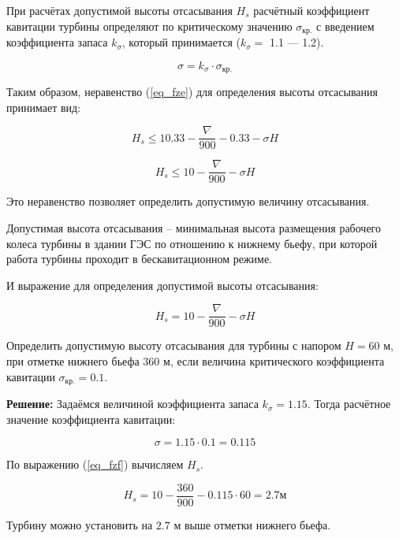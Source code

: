 При расчётах допустимой высоты отсасывания $H_s$ расчётный коэффициент кавитации  турбины определяют по критическому значению $\sigma_{\text{кр.}}$ с введением коэффициента запаса $k_{\sigma}$, который принимается ($k_{\sigma} = $ 1.1 --- 1.2).

$$
   \sigma = k_{\sigma} \cdot \sigma_{\text{кр.}}
$$

\vspace{0.5 cm}

Таким образом, неравенство (\ref{eq_fze}) для определения высоты отсасывания принимает вид:

$$
   H_s \leqslant 10.33 - \frac{\nabla}{900} - 0.33 - \sigma H
$$

$$
   H_s \leqslant 10 - \frac{\nabla}{900} - \sigma H
$$

Это неравенство позволяет определить допустимую величину отсасывания.

\begin{opred}
Допустимая высота отсасывания -- минимальная высота размещения рабочего колеса турбины в здании ГЭС по отношению к нижнему бьефу, при которой работа турбины проходит в бескавитационном режиме.
\end{opred}

И выражение для определения допустимой высоты отсасывания:

\begin{equation}
\label{eq_fzf}
   H_s = 10 - \frac{\nabla}{900} - \sigma H
\end{equation}


\vspace{1 cm}


\begin{primer}
\label{Primer1}
 Определить допустимую высоту отсасывания для турбины с напором $H = 60$ м, при отметке нижнего бьефа $360$ м, если величина критического коэффициента кавитации $\sigma_{\text{кр.}} = 0.1$.


\textbf{Решение:} Задаёмся величиной коэффициента запаса $k_{\sigma} = 1.15$. Тогда расчётное значение коэффициента кавитации:

$$
   \sigma = 1.15 \cdot 0.1 = 0.115
$$

По выражению (\ref{eq_fzf}) вычисляем $H_s$.

$$
   H_s = 10 - \frac{360}{900} - 0.115 \cdot 60 = 2.7 \text{м}
$$

Турбину можно установить на $2.7$ м выше отметки нижнего бьефа.
\end{primer}

\vspace{0.5 cm}



